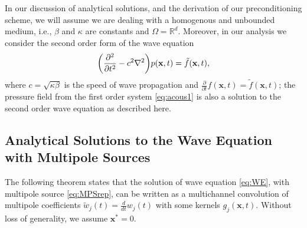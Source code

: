 In our discussion of analytical solutions, and the derivation of our preconditioning scheme, we will assume we are dealing with a homogenous and unbounded medium, i.e., $\beta$ and $\kappa$ are constants and $\Omega=\mathbb R^d$.
Moreover, in our analysis we consider the second order form of the wave equation \begin{equation}\label{eq:WE}
	\bigg(\frac{\partial^2}{\partial t^2} - c^2\nabla^2 \bigg) p(\mathbf x,t) = \tilde f(\mathbf x,t),
\end{equation}
where $c=\sqrt{\kappa \beta}$ is the speed of wave propagation and $\tfrac{\partial}{\partial t} f(\mathbf x,t) = \tilde f(\mathbf x,t)$;
the pressure field from the first order system \ref{eq:acous1} is also a solution to the second order wave equation as described here.



\subsection{Analytical Solutions to the Wave Equation with Multipole Sources}

The following theorem states that the solution of wave equation \ref{eq:WE}, with multipole source \ref{eq:MPSrep}, can be written as a multichannel convolution of multipole coefficients $\tilde w_j(t) = \tfrac{d}{dt}w_j(t)$ with some kernels $g_j(\mathbf x,t)$.
Without loss of generality, we assume $\mathbf x^*=0$.

